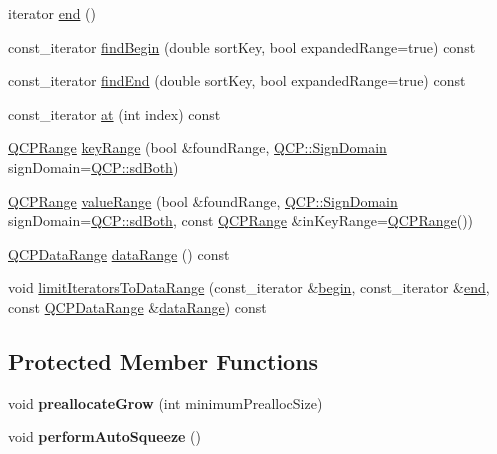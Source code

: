 \begin{DoxyCompactItemize}
\item 
iterator \hyperlink{classQCPDataContainer_acf66dfad83fe041380f5e0491e7676f2}{end} ()
\item 
const\+\_\+iterator \hyperlink{classQCPDataContainer_a8ffcab551fd06dd037874ef644c73467}{find\+Begin} (double sort\+Key, bool expanded\+Range=true) const 
\item 
const\+\_\+iterator \hyperlink{classQCPDataContainer_ad9b6b0343252eb3bbd591ee28aaa4e9d}{find\+End} (double sort\+Key, bool expanded\+Range=true) const 
\item 
const\+\_\+iterator \hyperlink{classQCPDataContainer_a6e92717af67e5e93a80f1f44ce040c74}{at} (int index) const 
\item 
\hyperlink{classQCPRange}{Q\+C\+P\+Range} \hyperlink{classQCPDataContainer_aba6e1a93c21ccc56a432b4a02c9d0ed2}{key\+Range} (bool \&found\+Range, \hyperlink{namespaceQCP_afd50e7cf431af385614987d8553ff8a9}{Q\+C\+P\+::\+Sign\+Domain} sign\+Domain=\hyperlink{namespaceQCP_afd50e7cf431af385614987d8553ff8a9aa38352ef02d51ddfa4399d9551566e24}{Q\+C\+P\+::sd\+Both})
\item 
\hyperlink{classQCPRange}{Q\+C\+P\+Range} \hyperlink{classQCPDataContainer_a35a102dc2424d1228fc374d9313efbe9}{value\+Range} (bool \&found\+Range, \hyperlink{namespaceQCP_afd50e7cf431af385614987d8553ff8a9}{Q\+C\+P\+::\+Sign\+Domain} sign\+Domain=\hyperlink{namespaceQCP_afd50e7cf431af385614987d8553ff8a9aa38352ef02d51ddfa4399d9551566e24}{Q\+C\+P\+::sd\+Both}, const \hyperlink{classQCPRange}{Q\+C\+P\+Range} \&in\+Key\+Range=\hyperlink{classQCPRange}{Q\+C\+P\+Range}())
\item 
\hyperlink{classQCPDataRange}{Q\+C\+P\+Data\+Range} \hyperlink{classQCPDataContainer_a0aa30487aa557b38c2e10f918454c085}{data\+Range} () const 
\item 
void \hyperlink{classQCPDataContainer_ad55f9e9c95ab4414b477d2f08ffd9bd7}{limit\+Iterators\+To\+Data\+Range} (const\+\_\+iterator \&\hyperlink{classQCPDataContainer_a80032518413ab8f418f7c81182fd06cb}{begin}, const\+\_\+iterator \&\hyperlink{classQCPDataContainer_acf66dfad83fe041380f5e0491e7676f2}{end}, const \hyperlink{classQCPDataRange}{Q\+C\+P\+Data\+Range} \&\hyperlink{classQCPDataContainer_a0aa30487aa557b38c2e10f918454c085}{data\+Range}) const 
\end{DoxyCompactItemize}
\subsection*{Protected Member Functions}
\begin{DoxyCompactItemize}
\item 
void {\bfseries preallocate\+Grow} (int minimum\+Prealloc\+Size)\hypertarget{classQCPDataContainer_aae8cdb2bcc3b900ec22f26df3e7d67c7}{}\label{classQCPDataContainer_aae8cdb2bcc3b900ec22f26df3e7d67c7}

\item 
void {\bfseries perform\+Auto\+Squeeze} ()\hypertarget{classQCPDataContainer_a83c25ac14be1c920df85e797ee75c982}{}\label{classQCPDataContainer_a83c25ac14be1c920df85e797ee75c982}

\end{DoxyCompactItemize}

